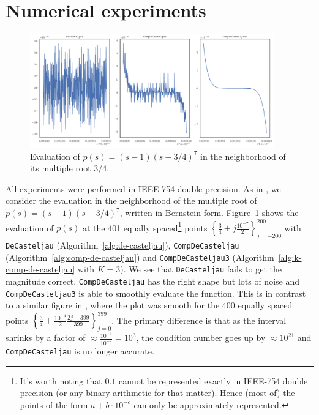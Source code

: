 \section{Numerical experiments}\label{sec:numerical}

\begin{figure}
  \includegraphics[width=0.9375\textwidth]
                  {../images/k-compensated/de_casteljau_smooth_drawing.pdf}
  \centering
  \captionsetup{width=.75\linewidth}
  \caption{Evaluation of \(p(s) = (s - 1)\left(s - 3/4\right)^7\)
    in the neighborhood of its multiple root \(3/4\).}
  \label{fig:smooth-drawing}
\end{figure}

All experiments were performed in IEEE-754 double precision.
As in \cite{Jiang2010}, we consider the evaluation in the neighborhood
of the multiple root of \(p(s) = (s - 1)\left(s - 3/4\right)^7\),
written in Bernstein form.
Figure~\ref{fig:smooth-drawing} shows the evaluation of \(p(s)\) at
the 401 equally spaced\footnote{It's worth noting that \(0.1\) cannot
be represented exactly in IEEE-754 double precision (or any binary
arithmetic for that matter). Hence (most of) the points of the form
\(a + b \cdot 10^{-c}\) can only be approximately represented.} points
\(\left\{\frac{3}{4} + j \frac{10^{-7}}{2}\right\}_{j=-200}^{200}\)
with \texttt{DeCasteljau} (Algorithm~\ref{alg:de-casteljau}),
\texttt{CompDeCasteljau} (Algorithm~\ref{alg:comp-de-casteljau})
and \texttt{CompDeCasteljau3} (Algorithm~\ref{alg:k-comp-de-casteljau}
with \(K = 3\)). We see that \texttt{DeCasteljau} fails to get the
magnitude correct, \texttt{CompDeCasteljau} has the right shape but
lots of noise and \texttt{CompDeCasteljau3} is able to smoothly evaluate
the function. This is in contrast to a similar figure in \cite{Jiang2010},
where the plot was smooth for the 400 equally spaced points
\(\left\{\frac{3}{4} + \frac{10^{-4}}{2} \frac{2j - 399}{399}
\right\}_{j=0}^{399}\). The primary difference is that as the interval
shrinks by a factor of \(\approx \frac{10^{-4}}{10^{-7}} = 10^3\), the
condition number goes up by \(\approx 10^{21}\) and \texttt{CompDeCasteljau}
is no longer accurate.

